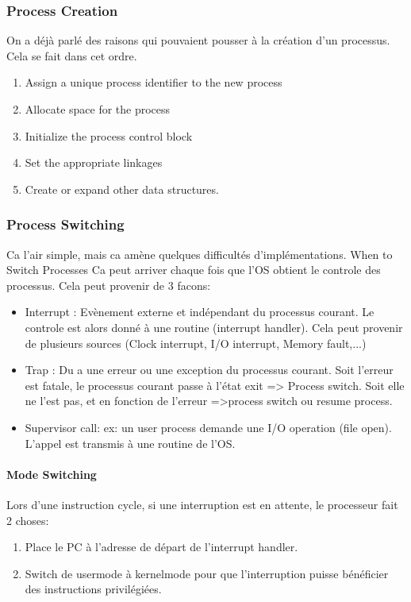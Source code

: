 \subsubsection{Process Creation}
On a déjà parlé des raisons qui pouvaient pousser à la création d'un processus.
Cela se fait dans cet ordre.
\begin{enumerate}
  \item Assign a unique process identifier to the new process
  \item Allocate space for the process
  \item Initialize the process control block
  \item Set the appropriate linkages
  \item Create or expand other data structures.
\end{enumerate}

\subsubsection{Process Switching}
Ca l'air simple, mais ca amène quelques difficultés d'implémentations.
When to Switch Processes
Ca peut arriver chaque fois que l'OS obtient le controle des processus.
Cela peut provenir de 3 facons:
\begin{itemize}
  \item Interrupt : Evènement externe et indépendant du processus courant.
Le controle est alors donné à une routine (interrupt handler).
Cela peut provenir de plusieurs sources (Clock interrupt, I/O interrupt, Memory fault,...)
  \item Trap : Du a une erreur ou une exception du processus courant.
Soit l'erreur est fatale, le processus courant passe à l'état exit => Process switch.
Soit elle ne l'est pas, et en fonction de l'erreur =>process switch ou resume process.
  \item Supervisor call: ex: un user process demande une I/O operation (file open).
L'appel est transmis à une routine de l'OS.
\end{itemize}
\paragraph{Mode Switching}
Lors d'une instruction cycle, si une interruption est en attente, le processeur fait 2 choses:
\begin{enumerate}
  \item Place le PC à l'adresse de départ de l'interrupt handler.
  \item Switch de usermode à kernelmode pour que l'interruption puisse bénéficier des instructions privilégiées.
\end{enumerate}
